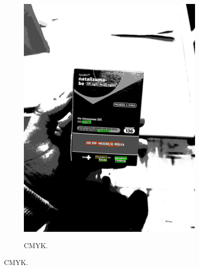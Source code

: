\begin{figure}[htb]
\begin{subfigure}[b]{0.21\textwidth}
        \includegraphics[width=\linewidth]{../pictures/tysabri_rgb_thresh_gray_thresh_boxes.jpg}
    \end{subfigure}
    \hfill
    \begin{subfigure}[b]{0.21\textwidth}
        \centering
        \caption{CMYK.}
        \label{fig:foto:versoes:2:CMYK:boxes}

\end{subfigure}
\end{figure}
